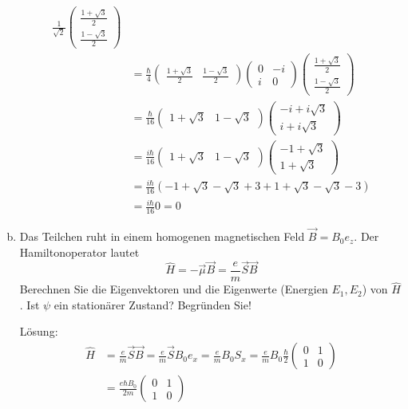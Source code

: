 \documentclass{scrartcl}
\newcommand{\Sx}{\begin{pmatrix}0&1\\1&0\end{pmatrix}}
\begin{document}
\begin{enumerate}[a)]
\begin{align*}
	\frac 1{\sqrt 2}\begin{pmatrix}\frac{1+\sqrt 3}{2}\\\frac{1-\sqrt 3}{2}\end{pmatrix}\\
	&= 	
	\frac \hbar 4 \begin{pmatrix}\frac{1+\sqrt 3}{2} & \frac{1-\sqrt 3}{2}\end{pmatrix}
	\begin{pmatrix} 0&-i\\i&0 \end{pmatrix}
	\begin{pmatrix}\frac{1+\sqrt 3}{2}\\\frac{1-\sqrt 3}{2}\end{pmatrix}\\
	&=
	\frac \hbar {16} \begin{pmatrix}1+\sqrt 3 & 1-\sqrt 3\end{pmatrix}
	\begin{pmatrix}-i+i\sqrt 3\\i+i\sqrt 3\end{pmatrix}\\
	&=
	\frac {i\hbar}{16} \begin{pmatrix}1+\sqrt 3 & 1-\sqrt 3\end{pmatrix}
	\begin{pmatrix}-1+\sqrt 3\\1+\sqrt 3\end{pmatrix}\\
	&=
	\frac {i\hbar}{16} (-1 + \sqrt 3 -\sqrt 3 + 3 + 1 + \sqrt 3  -\sqrt 3 -3) \\
	&=
	\frac{i\hbar}{16} 0 = 0
\end{align*}

\item Das Teilchen ruht in einem homogenen magnetischen Feld $\vec B = B_0 e_z$. Der Hamiltonoperator lautet
\[\hat H = -\vec \mu \vec B = \frac em \vec S \vec B \]
Berechnen Sie die Eigenvektoren und die Eigenwerte (Energien $E_1, E_2$) von $\hat H$. Ist $\psi$ ein stationärer Zustand? Begründen Sie!
\item[Lösung:]
\begin{align*}
\hat H &= \frac em \vec S \vec B = \frac em \vec S B_0 e_x = \frac em B_0 S_x = \frac em B_0 \frac \hbar 2 \begin{pmatrix}0&1\\1&0\end{pmatrix} \\
&= \frac{e\hbar B_0}{2m}\Sx
\end{align*}


\end{enumerate}
\end{document}
